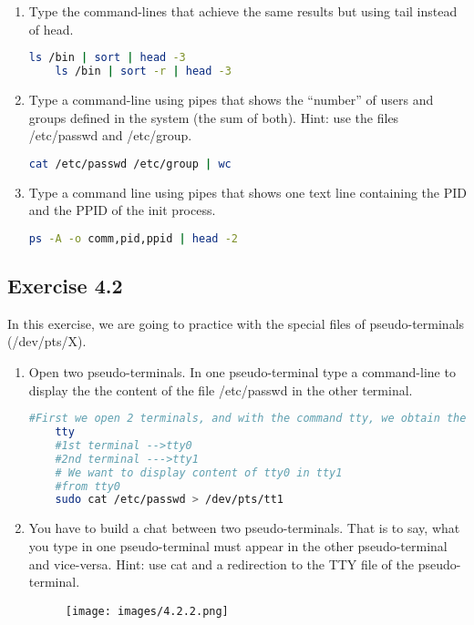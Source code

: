 \documentclass[12pt, titlepage,]{article}
\begin{document}
\begin{enumerate}
    \item Type the command-lines that achieve the same results but using tail instead of head. 
    \begin{lstlisting}[language=Bash]
    ls /bin | sort | head -3
    ls /bin | sort -r | head -3

    \end{lstlisting}

    
    \item Type a command-line using pipes that shows the “number” of users and groups defined in the system (the sum of both). Hint: use the files /etc/passwd and /etc/group. 
     \begin{lstlisting}[language=Bash]
    cat /etc/passwd /etc/group | wc
    \end{lstlisting}


    \item Type a command line using pipes that shows one text line containing the PID and the PPID of the init process. 
    \begin{lstlisting}[language=Bash]
    ps -A -o comm,pid,ppid | head -2
    \end{lstlisting}
\end{enumerate}
\clearpage

\subsection{Exercise 4.2} 
In this exercise, we are going to practice with the special files of pseudo-terminals (/dev/pts/X). 
\begin{enumerate}
    \item Open two pseudo-terminals. In one pseudo-terminal type a command-line to display the the content of the file /etc/passwd in the other terminal. 
    \begin{lstlisting}[language=Bash]
    #First we open 2 terminals, and with the command tty, we obtain the the virtul terminal number
    tty
    #1st terminal -->tty0
    #2nd terminal --->tty1
    # We want to display content of tty0 in tty1
    #from tty0
    sudo cat /etc/passwd > /dev/pts/tt1
    \end{lstlisting}
    

    \item  You have to build a chat between two pseudo-terminals. That is to say, what you type in one pseudo-terminal must appear in the other pseudo-terminal and vice-versa. Hint: use cat and a redirection to the TTY file of the pseudo-terminal.
    \begin{figure}[h] %
    \centering
    {\texttt{[image: images/4.2.2.png]}}
    \end{figure} 
\end{enumerate}
    \clearpage
    
\end{document}
